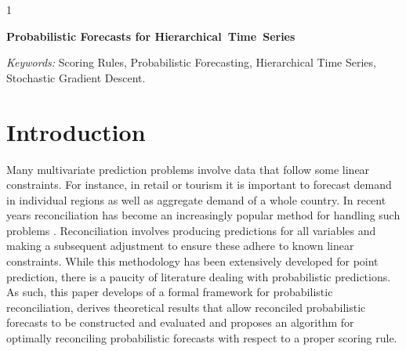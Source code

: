 \documentclass[12pt]{article}
\newcommand{\blind}{1}
\theoremstyle{definition}
\begin{document}
	\blind
	{
		\bigskip
		\bigskip
		\bigskip
		\begin{center}
			{\LARGE\bf Probabilistic Forecasts for Hierarchical~Time~Series}
		\end{center}
		\medskip
	} \fi
	
	\bigskip


\begin{abstract}
We develop a framework for prediction or forecasting of multivariate data that follow some known linear constraints, such as the example where some variables are aggregates of others. For point prediction, an increasingly popular technique is reconciliation, whereby predictions or forecasts are made for all series (so called `base' forecasts) and subsequently adjusted to ensure coherence with the constraints.  This paper extends reconciliation from the setting of point prediction to probabilistic prediction.  A novel definition of reconciliation is developed and used to construct densities and draw samples from a reconciled probabilistic prediction.  In the elliptical case, it is proven that the true predictive distribution can be recovered from reconciliation even when the location and scale matrix of the base prediction are chosen arbitrarily.  To find reconciliation weights, an objective function based on scoring rules is optimised.  The energy score is chosen since the log score is improper in the context of comparing unreconciled to reconciled forecasts, a result also proved in this paper.  To account for the stochastic nature of the energy score, optimisation is achieved using stochastic gradient descent.  ADD SOMETHING ABOUT SIMULATION AND APPLICATION.



\end{abstract}

\noindent%
{\it Keywords:}  Scoring Rules, Probabilistic Forecasting, Hierarchical Time Series, Stochastic Gradient Descent.

\newpage
{} %

\section{Introduction}\label{sec:intro}

Many multivariate prediction problems involve data that follow some linear constraints.  For instance, in retail or tourism it is important to forecast demand in individual regions as well as aggregate demand of a whole country.  In recent years reconciliation has become an increasingly popular method for handling such problems \citep[see][for an overview]{FPP2018}.  Reconciliation involves producing predictions for all variables and making a subsequent adjustment to ensure these adhere to known linear constraints.  While this methodology has been extensively developed for point prediction, there is a paucity of literature dealing with probabilistic predictions.  As such, this paper develops of a formal framework for probabilistic reconciliation, derives theoretical results that allow reconciled probabilistic forecasts to be constructed and evaluated and proposes an algorithm for optimally reconciling probabilistic forecasts with respect to a proper scoring rule.
\end{document}
